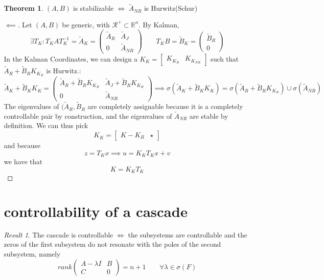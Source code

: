 \documentclass{book}
\newcommand{\R}{\mathbb{R}}
\theoremstyle{definition}
\newtheorem{theorem}{Theorem}[section]
\theoremstyle{remark}
\theoremstyle{remark}
\newtheorem*{result}{Result}
\begin{document}
\begin{theorem}
    $(A,B)$ is stabilizable $\iff$ $\tilde{A}_{NR}$ is Hurwitz(Schur)
\end{theorem}
\begin{proof}[$\impliedby$]
    Let $(A,B)$ be generic, with $\mathcal{R}^+\subset \R^n$. By Kalman,
    \[
    \exists T_K:T_KAT_K^{-1}=\tilde{A}_K=\begin{pmatrix}
        \tilde{A}_R & \tilde{A}_J\\
        0 & \tilde{A}_{NR}
    \end{pmatrix} \qquad T_KB=\tilde{B}_K= \begin{pmatrix}
        \tilde{B}_R \\ 0
    \end{pmatrix}
    \]
    In the Kalman Coordinates, we can design a $K_K=\begin{bmatrix}
        K_{K_R} & K_{K_{NR}}
    \end{bmatrix}$ such that $\tilde{A}_R+\tilde{B}_RK_{K_R}$ is Hurwitz.:
    \[
        \tilde{A}_K+\tilde{B}_KK_{K}=\begin{pmatrix}
            \tilde{A}_R+\tilde{B}_RK_{K_R} & \tilde{A}_J+\tilde{B}_RK_{K_R}\\
            0 & \tilde{A}_{NR}
        \end{pmatrix} \implies \sigma(\tilde{A}_K+\tilde{B}_KK_{K})=\sigma(\tilde{A}_R+\tilde{B}_RK_{K_R})\cup \sigma(\tilde{A}_{NR})
    \]
    The eigenvalues of $(\tilde{A}_R,\tilde{B}_R$ are completely assignable because it is a completely controllable pair by construction, and the eigenvalues of $\tilde{A}_{NR}$ are stable by definition. We can thus pick
    \[
    K_K=\begin{bmatrix}
        K-{K_R} & \star
    \end{bmatrix}
    \]
    and because
    \[
    z=T_Kx \implies u=K_KT_Kx+v
    \]
    we have that
    \[
    K=K_KT_K
    \]
\end{proof}



\section{controllability of a cascade}

\begin{result}
    The cascade is controllable $\iff$ the subsystems are controllable and the zeros of the first subsystem do not resonate with the poles of the second subsystem, namely
    \[
    rank\begin{pmatrix}
        A-\lambda I & B\\
        C & 0
    \end{pmatrix}=n+1 \qquad \forall \lambda \in \sigma(F)
    \]
\end{result}
\end{document}
